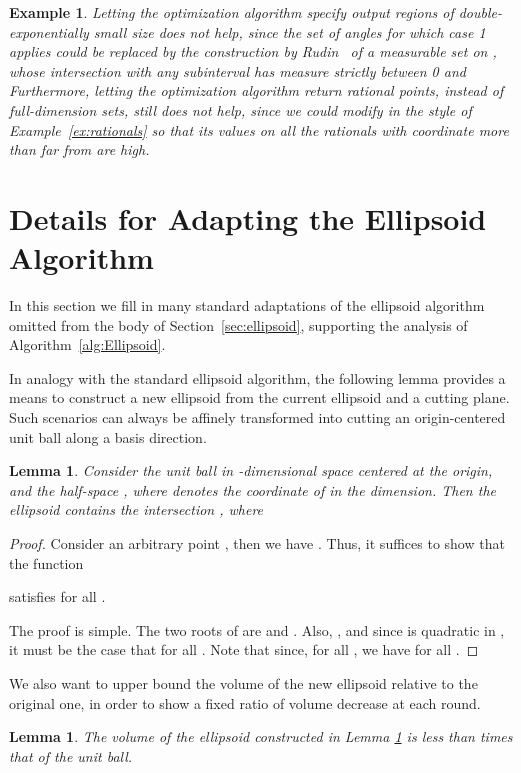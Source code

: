 \documentclass[11pt,letter]{article}
\newcounter{nTheorems}
\numberwithin{nTheorems}{section}
\newtheorem{lemma}[nTheorems]{Lemma}
\newtheorem{example}[nTheorems]{Example}
\begin{document}
\begin{example}
Letting the optimization algorithm specify output regions of double-exponentially small size does not help, since the set of angles for which case 1 applies could be replaced by the construction by Rudin~\cite{Rudin:1983} of a measurable set on , whose intersection with \emph{any} subinterval  has measure strictly between 0 and 
Furthermore, letting the optimization algorithm return rational points, instead of full-dimension sets, still does not help, since we could modify  in the style of Example~\ref{ex:rationals} so that its values on all the rationals with  coordinate more than  far from  are high.
\end{example}

\section{Details for Adapting the Ellipsoid Algorithm}\label{ap:ellipsoid}

In this section we fill in many standard adaptations of the ellipsoid algorithm omitted from the body of Section~\ref{sec:ellipsoid}, supporting the analysis of Algorithm~\ref{alg:Ellipsoid}.


In analogy with the standard ellipsoid algorithm, the following lemma provides a means to construct a new ellipsoid from the current ellipsoid and a cutting plane.
Such scenarios can always be affinely transformed into cutting an origin-centered unit ball along a basis direction.
\begin{lemma}
\label{lem:NewEllipsoid}
Consider the unit ball  in -dimensional space centered at the origin, and the half-space , where  denotes the coordinate of  in the  dimension.
Then the ellipsoid  contains the intersection , where

\end{lemma}

\begin{proof}
Consider an arbitrary point , then we have .
Thus, it suffices to show that the function

satisfies  for all .

The proof is simple.
The two roots of  are  and .
Also, , and since  is quadratic in , it must be the case that  for all .
Note that since,  for all , we have  for all .
\end{proof}

We also want to upper bound the volume of the new ellipsoid relative to the original one, in order to show a fixed ratio of volume decrease at each round.
\begin{lemma}
\label{lem:Volume}
The volume of the ellipsoid constructed in Lemma \ref{lem:NewEllipsoid} is less than  times that of the unit ball.
\end{lemma}
\end{document}
